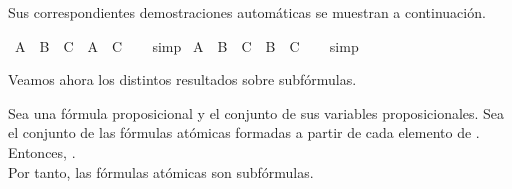 \begin{isabellebody}
\endisatagproof
{\isafoldproof}%
%
\isadelimproof
%
\endisadelimproof
%
\begin{isamarkuptext}%
Sus correspondientes demostraciones automáticas se muestran a continuación.%
\end{isamarkuptext}\isamarkuptrue%
\isamarkupfalse%
\ {\isachardoublequoteopen}A\ {\isasymunion}\ B\ {\isasymsubseteq}\ C\ {\isasymLongrightarrow}\ A\ {\isasymsubseteq}\ C{\isachardoublequoteclose}\isanewline
%
\isadelimproof
\ \ %
\endisadelimproof
%
\isatagproof
{}\isamarkupfalse%
\ simp%
\endisatagproof
{\isafoldproof}%
%
\isadelimproof
\isanewline
%
\endisadelimproof
\isanewline
{}\isamarkupfalse%
\ {\isachardoublequoteopen}A\ {\isasymunion}\ B\ {\isasymsubseteq}\ C\ {\isasymLongrightarrow}\ B\ {\isasymsubseteq}\ C{\isachardoublequoteclose}\isanewline
%
\isadelimproof
\ \ %
\endisadelimproof
%
\isatagproof
{}\isamarkupfalse%
\ simp%
\endisatagproof
{\isafoldproof}%
%
\isadelimproof
%
\endisadelimproof
%
\begin{isamarkuptext}%
Veamos ahora los distintos resultados sobre subfórmulas.

  \begin{lema}
    Sea  una fórmula proposicional y  el conjunto de sus variables proposicionales.
    Sea  el conjunto de las fórmulas atómicas formadas a partir de cada elemento de 
    . Entonces, .\\ 
    Por tanto, las fórmulas atómicas son subfórmulas.
  \end{lema}


\end{isamarkuptext}
\end{isabellebody}
